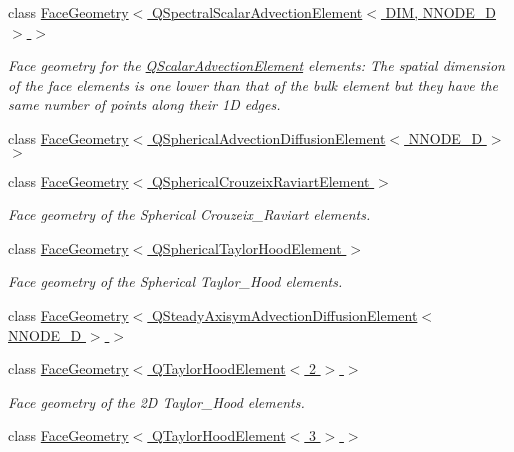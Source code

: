 \begin{DoxyCompactItemize}
class \hyperlink{classoomph_1_1FaceGeometry_3_01QSpectralScalarAdvectionElement_3_01DIM_00_01NNODE__1D_01_4_01_4}{Face\+Geometry$<$ Q\+Spectral\+Scalar\+Advection\+Element$<$ D\+I\+M, N\+N\+O\+D\+E\+\_\+D $>$ $>$}
\begin{DoxyCompactList}\small\item\em Face geometry for the \hyperlink{classoomph_1_1QScalarAdvectionElement}{Q\+Scalar\+Advection\+Element} elements\+: The spatial dimension of the face elements is one lower than that of the bulk element but they have the same number of points along their 1D edges. \end{DoxyCompactList}\item 
class \hyperlink{classoomph_1_1FaceGeometry_3_01QSphericalAdvectionDiffusionElement_3_01NNODE__1D_01_4_01_4}{Face\+Geometry$<$ Q\+Spherical\+Advection\+Diffusion\+Element$<$ N\+N\+O\+D\+E\+\_\+D $>$ $>$}
\item 
class \hyperlink{classoomph_1_1FaceGeometry_3_01QSphericalCrouzeixRaviartElement_01_4}{Face\+Geometry$<$ Q\+Spherical\+Crouzeix\+Raviart\+Element $>$}
\begin{DoxyCompactList}\small\item\em Face geometry of the Spherical Crouzeix\+\_\+\+Raviart elements. \end{DoxyCompactList}\item 
class \hyperlink{classoomph_1_1FaceGeometry_3_01QSphericalTaylorHoodElement_01_4}{Face\+Geometry$<$ Q\+Spherical\+Taylor\+Hood\+Element $>$}
\begin{DoxyCompactList}\small\item\em Face geometry of the Spherical Taylor\+\_\+\+Hood elements. \end{DoxyCompactList}\item 
class \hyperlink{classoomph_1_1FaceGeometry_3_01QSteadyAxisymAdvectionDiffusionElement_3_01NNODE__1D_01_4_01_4}{Face\+Geometry$<$ Q\+Steady\+Axisym\+Advection\+Diffusion\+Element$<$ N\+N\+O\+D\+E\+\_\+D $>$ $>$}
\item 
class \hyperlink{classoomph_1_1FaceGeometry_3_01QTaylorHoodElement_3_012_01_4_01_4}{Face\+Geometry$<$ Q\+Taylor\+Hood\+Element$<$ 2 $>$ $>$}
\begin{DoxyCompactList}\small\item\em Face geometry of the 2D Taylor\+\_\+\+Hood elements. \end{DoxyCompactList}\item 
class \hyperlink{classoomph_1_1FaceGeometry_3_01QTaylorHoodElement_3_013_01_4_01_4}{Face\+Geometry$<$ Q\+Taylor\+Hood\+Element$<$ 3 $>$ $>$}

\end{DoxyCompactItemize}
